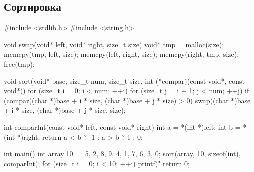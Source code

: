 \subsection{Сортировка}
\begin{ccode}
#include <stdlib.h>
#include <string.h>

void swap(void* left, void* right, size_t size) {
    void* tmp = malloc(size);
    memcpy(tmp, left, size);
    memcpy(left, right, size);
    memcpy(right, tmp, size);
    free(tmp);
}

void sort(void* base, size_t num, size_t size, int (*compar)(const void*, const void*)) {
    for (size_t i = 0; i < num; ++i) 
	for (size_t j = i + 1; j < num; ++j) 
	    if (compar((char *)base + i * size, (char *)base + j * size) > 0)
		swap((char *)base + i * size, (char *)base + j * size, size);
}

int comparInt(const void* left, const void* right) {
    int a = *(int *)left;
    int b = *(int *)right;
    return a < b ? -1 : a > b ? 1 : 0;
}

int main()
{
    int array[10] = {5, 2, 8, 9, 4, 1, 7, 6, 3, 0};
    sort(array, 10, sizeof(int), comparInt);
    for (size_t i = 0; i < 10; ++i)
	printf("%
    return 0;
}
\end{ccode}
% 

